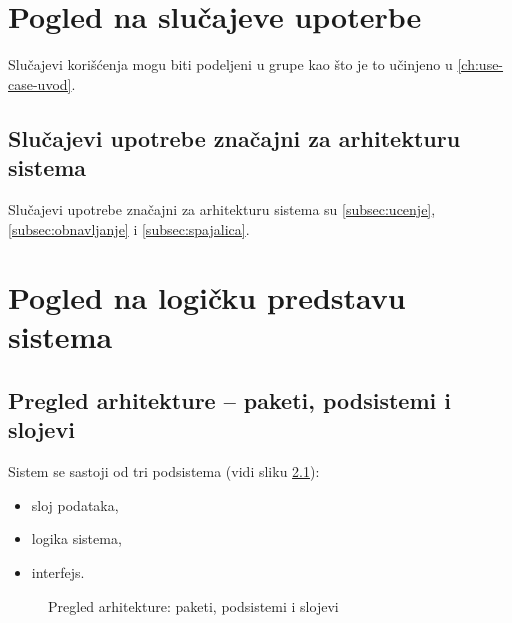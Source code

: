 \chapter{Pogled na slučajeve upoterbe}
Slučajevi korišćenja mogu biti podeljeni u grupe kao što je to učinjeno u \ref{ch:use-case-uvod}.

\section{Slučajevi upotrebe značajni za arhitekturu sistema}
Slučajevi upotrebe značajni za arhitekturu sistema su \ref{subsec:ucenje}, \ref{subsec:obnavljanje} i \ref{subsec:spajalica}.

\chapter{Pogled na logičku predstavu sistema}

\section{Pregled arhitekture -- paketi, podsistemi i slojevi}

Sistem se sastoji od tri podsistema (vidi sliku \ref{fig:paketi}):
\begin{itemize}
  \item sloj podataka,
  \item logika sistema,
  \item interfejs.
\end{itemize}

\begin{figure}[htbp]
  \centering
  \caption{Pregled arhitekture: paketi, podsistemi i slojevi}
  \label{fig:paketi}
\end{figure}

